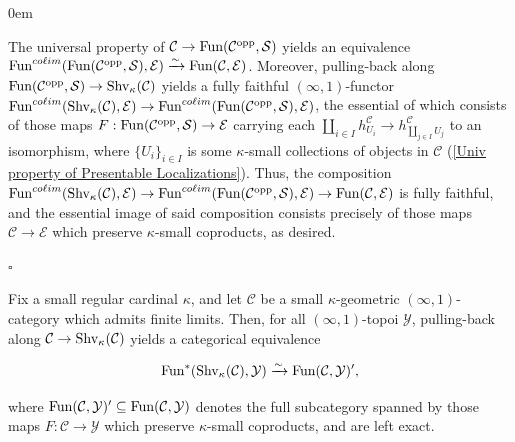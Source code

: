 \documentclass[10pt]{article}
\newcommand{\mS}{\mathcal S}
\newcommand{\C}{\mathcal C}
\newcommand{\cE}{\mathcal{E}}
\newcommand{\cY}{\mathcal{Y}}
\renewcommand{\qed}{\hfill$\square$}
\renewenvironment{proof}{\begin{addmargin}[1em]{0em}\begin{newproof}}{\end{newproof}\end{addmargin}\qed}
\theoremstyle{witharg}
\theoremstyle{witharg}
\theoremstyle{witharg2}
\begin{document}
\begin{proof}

    The universal property of $\C\rightarrow \textnormal{Fun}(\C^{\textnormal{opp}},\mS)$ yields an equivalence $\textnormal{Fun}^{co \ell im}(\textnormal{Fun}(\C^{\textnormal{opp}},\mS),\cE)\xrightarrow{\sim} \textnormal{Fun}(\C,\cE)$. Moreover, pulling-back along $\textnormal{Fun}(\C^{\textnormal{opp}},\mS)\rightarrow \textnormal{Shv}_{\kappa}(\C)$ yields a fully faithful $(\infty,1)$-functor $\textnormal{Fun}^{co\ell im}(\textnormal{Shv}_{\kappa}(\C),\cE)\rightarrow \textnormal{Fun}^{co \ell im}(\textnormal{Fun}(\C^{\textnormal{opp}},\mS),\cE)$, the essential of which consists of those maps $F:\textnormal{Fun}(\C^{\textnormal{opp}},\mS)\rightarrow \cE$ carrying each $\coprod_{i\in I}h^\C_{U_i}\rightarrow h^\C_{\coprod_{j\in I}U_j}$ to an isomorphism, where $\{U_i\}_{i\in I}$ is some $\kappa$-small collections of objects in $\C$ (\ref{Univ property of Presentable Localizations}). Thus, the composition $\textnormal{Fun}^{co \ell im}(\textnormal{Shv}_{\kappa}(\C),\cE)\rightarrow \textnormal{Fun}^{co \ell im}(\textnormal{Fun}(\C^{\textnormal{opp}},\mS),\cE)\rightarrow \textnormal{Fun}(\C,\cE)$ is fully faithful, and the essential image of said composition consists precisely of those maps $\C\rightarrow \cE$ which preserve $\kappa$-small coproducts, as desired. 
    
\end{proof}



\begin{corollary}{}
    
     Fix a small regular cardinal $\kappa$, and let $\C$ be a small $\kappa$-geometric $(\infty,1)$-category which admits finite limits. Then, for all $(\infty,1)$-topoi $\cY$, pulling-back along $\C\rightarrow \textnormal{Shv}_{\kappa}(\C)$ yields a categorical equivalence 

     $$\textnormal{Fun}^*(\textnormal{Shv}_{\kappa}(\C),\cY)\xrightarrow{\sim}\textnormal{Fun}(\C,\cY)^{\prime},$$

     \noindent where $\textnormal{Fun}(\C,\cY)^\prime\subseteq \textnormal{Fun}(\C,\cY)$ denotes the full subcategory spanned by those maps $F:\C\rightarrow \cY$ which preserve $\kappa$-small coproducts, and are left exact. 
    
\end{corollary}
\end{document}
